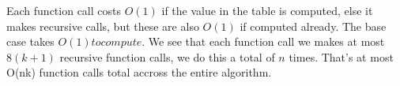 \documentclass[11pt]{article}
\begin{document}
Each function call costs $O(1)$ if the value in the table is computed, else it makes recursive calls, but these are also $O(1)$ if computed already.
The base case takes $O(1) to compute$. We see that each function call we makes at most $8(k+1)$ recursive function calls, we do this a total of $n$ times. That's at most O(nk) function calls total accross the entire algorithm.
\end{document}
